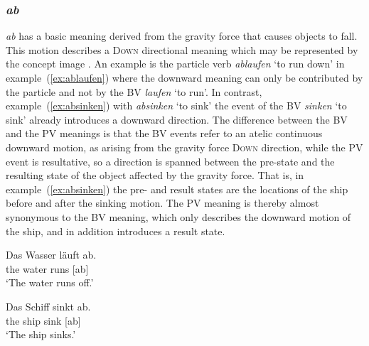 \documentclass[output=paper]{langsci/langscibook}
\begin{document}
\vspace{+1mm}
\subsubsection{\textit{ab}}

\textit{ab} has a basic meaning derived from the gravity force that
causes objects to fall. This motion describes a \textsc{Down}
directional meaning which may be represented by the concept image
. An example is the particle verb \textit{ablaufen}
`to run down' in example~(\ref{ex:ablaufen}) where the downward
meaning can only be contributed by the particle and not by the BV
\textit{laufen} `to run'. In contrast, example~(\ref{ex:absinken})
with \textit{absinken} `to sink'
the event of the BV \textit{sinken} `to sink'
already introduces a downward direction. The difference between the BV
and the PV meanings is that the BV events refer to an atelic
continuous downward motion, as arising from the gravity force
\textsc{Down} direction, while the PV event is resultative, so a
direction is spanned between the pre-state and the resulting state of
the object affected by the gravity force. That is, in
example~(\ref{ex:absinken}) the pre- and result states are the
locations of the ship before and after the sinking motion. The PV
meaning is thereby almost synonymous to the BV meaning, which only
describes the downward motion of the ship, and in addition introduces
a result state.

\ea\label{ex:ablaufen}
\gll Das Wasser läuft ab.\\
the water runs [ab]\\
\glt `The water runs off.'
\z

\ea\label{ex:absinken}
\gll Das Schiff sinkt ab.\\
the ship sink [ab]\\
\glt `The ship sinks.'
\z
  
\end{document}
